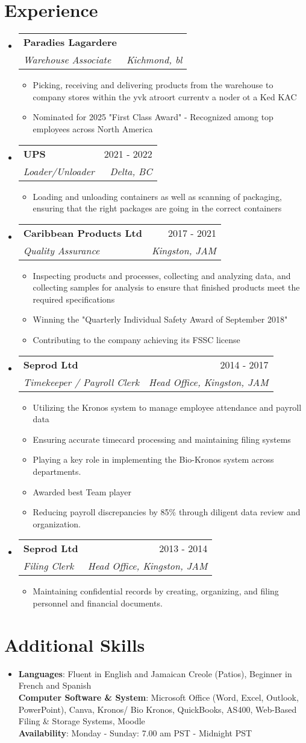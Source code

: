 \documentclass[letterpaper,11pt]{article}
\makeatletter
\newcommand{\resumeItem}[1]{
\item\small{
{#1 \vspace{-2pt}}
}
}
\newcommand{\resumeSubheading}[4]{
\vspace{-2pt}\item
\begin{tabular*}{0.97\textwidth}[t]{l@{\extracolsep{\fill}}r}
\textbf{#1} & #2 \\
\textit{\small#3} & \textit{\small #4} \\
\end{tabular*}\vspace{-7pt}
}
\newcommand{\resumeSubHeadingListStart}{\begin{itemize}[leftmargin=0.15in, label={}]}
\newcommand{\resumeSubHeadingListEnd}{\end{itemize}}
\newcommand{\resumeItemListStart}{\begin{itemize}}
\newcommand{\resumeItemListEnd}{\end{itemize}\vspace{-5pt}}
\makeatother
\begin{document}
\section{Experience}
\resumeSubHeadingListStart
\resumeSubheading{Paradies Lagardere}{}{Warehouse Associate}{Kichmond, bl}
\resumeItemListStart
\resumeItem{Picking, receiving and delivering products from the warehouse to company stores within the yvk atroort currentv a noder ot a Ked KAC}
\resumeItem{Nominated for 2025 "First Class Award" - Recognized among top employees across North America}
\resumeItemListEnd
\resumeSubheading{UPS}{2021 - 2022}{Loader/Unloader}{Delta, BC}
\resumeItemListStart
\resumeItem{Loading and unloading containers as well as scanning of packaging, ensuring that the right packages are going in the correct containers}
\resumeItemListEnd
\resumeSubheading{Caribbean Products Ltd}{2017 - 2021}{Quality Assurance}{Kingston, JAM}
\resumeItemListStart
\resumeItem{Inspecting products and processes, collecting and analyzing data, and collecting samples for analysis to ensure that finished products meet the required specifications}
\resumeItem{Winning the "Quarterly Individual Safety Award of September 2018"}
\resumeItem{Contributing to the company achieving its FSSC license}
\resumeItemListEnd
\resumeSubheading{Seprod Ltd}{2014 - 2017}{Timekeeper / Payroll Clerk}{Head Office, Kingston, JAM}
\resumeItemListStart
\resumeItem{Utilizing the Kronos system to manage employee attendance and payroll data}
\resumeItem{Ensuring accurate timecard processing and maintaining filing systems}
\resumeItem{Playing a key role in implementing the Bio-Kronos system across departments.}
\resumeItem{Awarded best Team player}
\resumeItem{Reducing payroll discrepancies by 85\% through diligent data review and organization.}
\resumeItemListEnd
\resumeSubheading{Seprod Ltd}{2013 - 2014}{Filing Clerk}{Head Office, Kingston, JAM}
\resumeItemListStart
\resumeItem{Maintaining confidential records by creating, organizing, and filing personnel and financial documents.}
\resumeItemListEnd
\resumeSubHeadingListEnd

\section{Additional Skills}
\begin{itemize}[leftmargin=0.15in, label={}]
\item{
\textbf{Languages}{: Fluent in English and Jamaican Creole (Patios), Beginner in French and Spanish} \\
\textbf{Computer Software \& System}{: Microsoft Office (Word, Excel, Outlook, PowerPoint), Canva, Kronos/ Bio Kronos, QuickBooks, AS400, Web-Based Filing \& Storage Systems, Moodle} \\
\textbf{Availability}{: Monday - Sunday: 7.00 am PST - Midnight PST}
} \\
\end{itemize}

\end{document}
